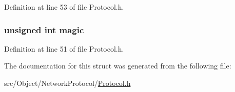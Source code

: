 Definition at line 53 of file Protocol.h.

\hypertarget{struct_cmd_header_check_sum_a7154179fe070a40c828f7c03f454d4d6}{
\subsubsection[{magic}]{\setlength{\rightskip}{0pt plus 5cm}unsigned int {\bf magic}}}
\label{struct_cmd_header_check_sum_a7154179fe070a40c828f7c03f454d4d6}


Definition at line 51 of file Protocol.h.



The documentation for this struct was generated from the following file:\begin{DoxyCompactItemize}
\item 
src/Object/NetworkProtocol/\hyperlink{_protocol_8h}{Protocol.h}\end{DoxyCompactItemize}
